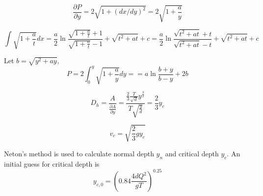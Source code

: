 \begin{equation}  
\frac{\partial P}{\partial y}= 2\sqrt{1 + (dx/dy)^2} = 2\sqrt{1 + \frac{a}{y}}
\end{equation}



\begin{equation}  
\int \sqrt{1+\frac{a}{t}}dx = \frac{a}{2}\ln \frac{\sqrt{1+\frac{a}{t}} +1}{\sqrt{1+\frac{a}{t}} -1} 
                                             + \sqrt{t^2+at} + c 
                                             = \frac{a}{2}\ln \frac{\sqrt{t^2+at} +t}{\sqrt{t^2+at} -t} 
                                             + \sqrt{t^2+at} + c 
\end{equation}

\noindent Let $b = \sqrt{y^2 + ay}$,
\begin{equation}  
P= 2\int_0^y \sqrt{1 + \frac{a}{y}}dy = = a \ln \frac{b + y}{b -  y} + 2b
\end{equation}

\begin{equation}  
D_h = \frac{A}{\frac{\partial A}{\partial y}} = \frac{ \frac{2}{3}\frac{T}{\sqrt{d}}y^{\frac{3}{2}}}{T\sqrt{\frac{y}{d}}} = \frac{2}{3}y_c
\end{equation}

\begin{equation}  
v_c = \sqrt{\frac{2}{3}gy_c}
\end{equation}

\noindent Neton's method is used to calculate normal depth $y_n$ and critical depth $y_c$. An initial guess for critical depth \cite{French1985} is
\begin{equation}
y_{c,0} =  \left(0.84 \frac{4dQ^2}{gT}\right)^{0.25}
\end{equation}
